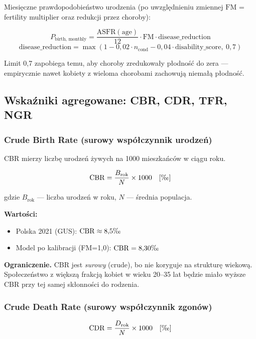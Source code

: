 \documentclass[11pt,a4paper]{article}
\newcommand{\promile}{\ensuremath{\text{\textperthousand}}}
\begin{document}
Miesięczne prawdopodobieństwo urodzenia (po uwzględnieniu zmiennej $\mathrm{FM}$ = fertility multiplier oraz redukcji przez choroby):
\begin{formulabox}
\[
P_{\text{birth, monthly}} = \frac{\mathrm{ASFR}(\text{age})}{12} \cdot \mathrm{FM} \cdot \text{disease\_reduction}
\]
\[
\text{disease\_reduction} = \max(1 - 0{,}02 \cdot n_{\text{cond}} - 0{,}04 \cdot \text{disability\_score},\ 0{,}7)
\]
\end{formulabox}

Limit 0{,}7 zapobiega temu, aby choroby zredukowały płodność do zera --- empirycznie nawet kobiety z wieloma chorobami zachowują niemałą płodność.

\subsection{Wskaźniki agregowane: CBR, CDR, TFR, NGR}

\subsubsection{Crude Birth Rate (surowy współczynnik urodzeń)}

CBR mierzy liczbę urodzeń żywych na 1000 mieszkańców w ciągu roku.
\begin{formulabox}
\[
\mathrm{CBR} = \frac{B_{\text{rok}}}{N} \times 1000 \quad [\promile]
\]
\end{formulabox}
gdzie $B_{\text{rok}}$ --- liczba urodzeń w roku, $N$ --- średnia populacja.

\textbf{Wartości:}
\begin{itemize}
  \item Polska 2021 (GUS): $\mathrm{CBR} \approx 8{,}5\promile$
  \item Model po kalibracji (FM=1{,}0): $\mathrm{CBR} = 8{,}30\promile$ \checkmark
\end{itemize}

\textbf{Ograniczenie.} CBR jest \emph{surowy} (crude), bo nie koryguje na strukturę wiekową. Społeczeństwo z większą frakcją kobiet w wieku 20--35 lat będzie miało wyższe CBR przy tej samej skłonności do rodzenia.

\subsubsection{Crude Death Rate (surowy współczynnik zgonów)}

\begin{formulabox}
\[
\mathrm{CDR} = \frac{D_{\text{rok}}}{N} \times 1000 \quad [\promile]
\]
\end{formulabox}
\end{document}
